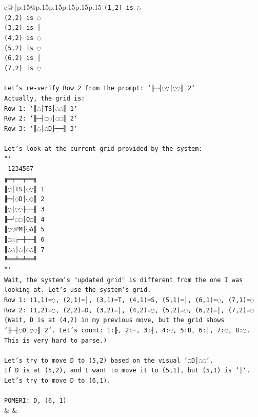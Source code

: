 \documentclass{article}
\begin{document}
{\begin{supertabular}{c@{$\;$}|p{.15\linewidth}@{}p{.15\linewidth}p{.15\linewidth}p{.15\linewidth}p{.15\linewidth}p{.15\linewidth}}
{{{\texttt{(1,2) is ◌} \\
\texttt{(2,2) is ◌} \\
\texttt{(3,2) is │} \\
\texttt{(4,2) is ◌} \\
\texttt{(5,2) is ◌} \\
\texttt{(6,2) is │} \\
\texttt{(7,2) is ◌} \\
\\ 
\texttt{Let's re{-}verify Row 2 from the prompt: `╟─┤◌◌│◌◌║ 2`} \\
\texttt{Actually, the grid is:} \\
\texttt{Row 1: `║◌│TS│◌◌║ 1`} \\
\texttt{Row 2: `╟─┤◌◌│◌◌║ 2`} \\
\texttt{Row 3: `║◌│◌D├──╢ 3`} \\
\\ 
\texttt{Let's look at the current grid provided by the system:} \\
\texttt{```} \\
\texttt{ 1234567} \\
\texttt{╔═╤══╤══╗} \\
\texttt{║◌│TS│◌◌║ 1} \\
\texttt{╟─┤◌D│◌◌║ 2} \\
\texttt{║◌│◌◌├──╢ 3} \\
\texttt{╟─┘◌◌│O◌║ 4} \\
\texttt{║◌◌PM│◌A║ 5} \\
\texttt{║◌◌┌─┼──╢ 6} \\
\texttt{║◌◌│◌│◌◌║ 7} \\
\texttt{╚══╧═╧══╝} \\
\texttt{```} \\
\texttt{Wait, the system's "updated grid" is different from the one I was looking at. Let's use the system's grid.} \\
\texttt{Row 1: (1,1)=◌, (2,1)=│, (3,1)=T, (4,1)=S, (5,1)=│, (6,1)=◌, (7,1)=◌} \\
\texttt{Row 2: (1,2)=◌, (2,2)=D, (3,2)=│, (4,2)=◌, (5,2)=◌, (6,2)=│, (7,2)=◌ (Wait, D is at (4,2) in my previous move, but the grid shows `╟─┤◌D│◌◌║ 2`. Let's count: 1:╟, 2:─, 3:┤, 4:◌, 5:D, 6:│, 7:◌, 8:◌. This is very hard to parse.)} \\
\\ 
\texttt{Let's try to move D to (5,2) based on the visual `◌D│◌◌`.} \\
\texttt{If D is at (5,2), and I want to move it to (5,1), but (5,1) is `│`.} \\
\texttt{Let's try to move D to (6,1).} \\
\\ 
\texttt{POMERI: D, (6, 1)} \\
            }
        }
    }
    & & \\ \\


\end{supertabular}}
\end{document}
